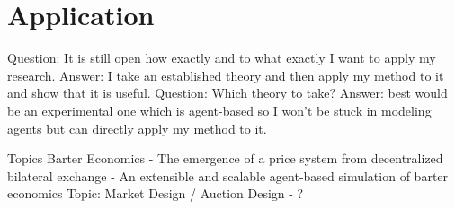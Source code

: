 \documentclass{article}
\begin{document}

\section{Application}
Question: It is still open how exactly and to what exactly I want to apply my research. Answer: I take an established theory and then apply my method to it and show that it is useful.
Question: Which theory to take? Answer: best would be an experimental one which is agent-based so I won’t be stuck in modeling agents but can directly apply my method to it.

Topics Barter Economics
- The emergence of a price system from decentralized bilateral exchange
- An extensible and scalable agent-based simulation of barter economics
Topic: Market Design / Auction Design
 - ?
\end{document}
